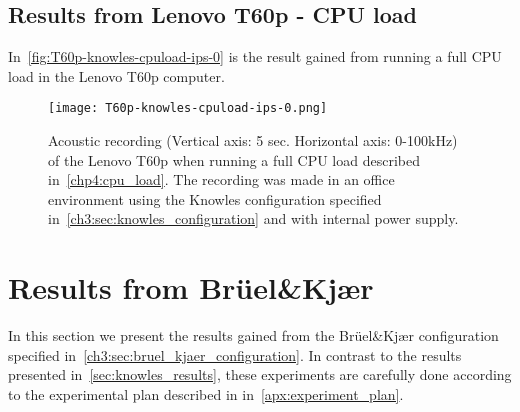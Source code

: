 \subsection{Results from Lenovo T60p - CPU load}\label{subsec:t60p_knowles_results_cpuload}
In~\autoref{fig:T60p-knowles-cpuload-ips-0} is the result gained from running a full CPU load in the Lenovo T60p computer. 
\begin{figure}[ht]
    \centering
    \texttt{[image: T60p-knowles-cpuload-ips-0.png]}
    \caption{Acoustic recording (Vertical axis: 5 sec. Horizontal axis: 0-100kHz) of the Lenovo T60p when running a full CPU load described in~\autoref{chp4:cpu_load}. The recording was made in an office environment using the Knowles configuration specified in~\autoref{ch3:sec:knowles_configuration} and with internal power supply. }
    \label{fig:T60p-knowles-cpuload-ips-0}
\end{figure}

\section{Results from Brüel\&Kjær}\label{sec:bk_results}
In this section we present the results gained from the Brüel\&Kjær configuration specified in~\autoref{ch3:sec:bruel_kjaer_configuration}. 
In contrast to the results presented in~\autoref{sec:knowles_results}, these experiments are carefully done according to the experimental plan described in in~\autoref{apx:experiment_plan}. 

